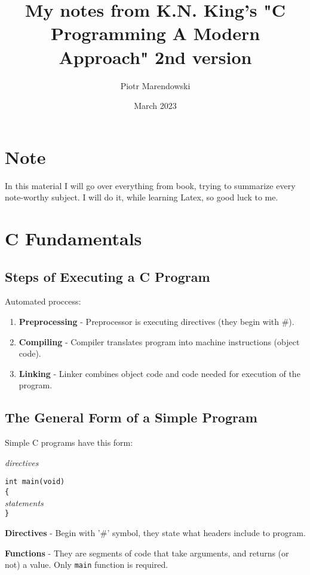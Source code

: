 \documentclass[openany]{book}
\title{My notes from K.N. King's "C Programming A Modern Approach" 2nd version}
\author{Piotr Marendowski}
\date{March 2023}
\newcommand\tab[1][20px]{\hspace*{#1}}      %
\begin{document}
    \maketitle

    \chapter{Note}
    In this material I will go over everything from book, trying to summarize every note-worthy subject. I will do it, while learning Latex, so good luck to me.

    \tableofcontents



    \chapter{C Fundamentals}
    
    \section{Steps of Executing a C Program}
    Automated proccess:
    \begin{enumerate}
        \item\textbf{Preprocessing} - Preprocessor is executing directives (they begin with \#).
        \item\textbf{Compiling} - Compiler translates program into machine instructions (object code).
        \item\textbf{Linking} - Linker combines object code and code needed for execution of the program.
    \end{enumerate}

    \section{The General Form of a Simple Program} Simple C programs have this form:

    \bigskip
    \textit{directives}
    \smallskip

    \small\texttt{int main(void)} \\
    \small\texttt{\{} \\
    \tab\textit{statements} \\
    \small\texttt{\}}
    \bigskip

    \textbf{Directives} - Begin with '\#' symbol, they state what headers include to program.

    \textbf{Functions} - They are segments of code that take arguments, and returns (or not) a value. Only \texttt{main} function is required.
\end{document}

